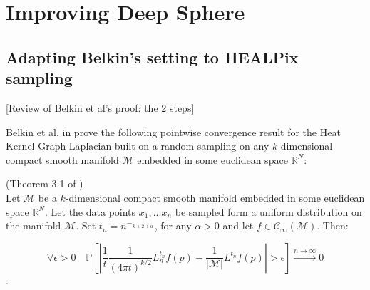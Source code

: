 

\section{Improving Deep Sphere}

\subsection{Adapting Belkin's setting to HEALPix sampling}

[Review of Belkin et al's proof: the 2 steps] 

Belkin et al. in \cite{Belkin:2005:TTF:2138147.2138189} prove the following pointwise convergence result for the Heat Kernel Graph Laplacian built on a random sampling on any $k$-dimensional compact smooth manifold $\mathcal M$ embedded in some euclidean space $\mathbb R^N$:
\vspace{0.5cm}
\begin{theorem}{(Theorem 3.1 of \cite{Belkin:2005:TTF:2138147.2138189})}\\
	\label{theo:Belkin pointwise convergence}
	Let $\mathcal M$ be a $k$-dimensional compact smooth manifold embedded in some euclidean space $\mathbb R^N$. Let the data points $x_1, ... x_n$ be sampled form a uniform distribution on the manifold $\mathcal M$. Set $t_n=n^{-\frac{1}{k+2+\alpha}}$, for any $\alpha>0$ and let $f\in\mathcal C_\infty(\mathcal M)$. Then:
	
	$$\forall \epsilon>0\quad \mathbb{P}\left[\left|\frac{1}{t}\frac{1}{(4 \pi t)^{k/2}}L_{n}^{t_n} f(p)-  \frac{1}{|\mathcal M|}L^{t_n} f(p)\right|>\epsilon\right] \xrightarrow{n\to\infty} 0$$. 
\end{theorem}
\vspace{0.5cm}

